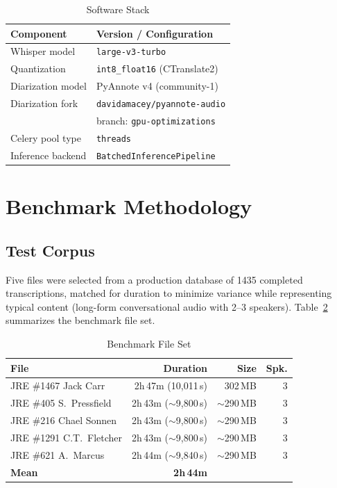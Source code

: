 \documentclass[conference,10pt]{IEEEtran}
\begin{document}
\begin{table}[!t]
\centering
\caption{Software Stack}
\label{tab:software}
\begin{tabular}{@{}ll@{}}
\toprule
\textbf{Component} & \textbf{Version / Configuration} \\
\midrule
Whisper model      & \texttt{large-v3-turbo} \\
Quantization       & \texttt{int8\_float16} (CTranslate2) \\
Diarization model  & PyAnnote v4 (community-1) \\
Diarization fork   & \texttt{davidamacey/pyannote-audio} \\
                   & \quad branch: \texttt{gpu-optimizations} \\
Celery pool type   & \texttt{threads} \\
Inference backend  & \texttt{BatchedInferencePipeline} \\
\bottomrule
\end{tabular}
\end{table}

\section{Benchmark Methodology}

\subsection{Test Corpus}

Five files were selected from a production database of \num{1435} completed
transcriptions, matched for duration to minimize variance while representing
typical content (long-form conversational audio with 2--3 speakers).
Table~\ref{tab:files} summarizes the benchmark file set.

\begin{table}[!t]
\centering
\caption{Benchmark File Set}
\label{tab:files}
\begin{tabular}{@{}lrrr@{}}
\toprule
\textbf{File} & \textbf{Duration} & \textbf{Size} & \textbf{Spk.} \\
\midrule
JRE \#1467 Jack Carr       & 2h\,47m (10,011\,s) & 302\,MB & 3 \\
JRE \#405 S.\ Pressfield   & 2h\,43m (${\sim}$9,800\,s) & ${\sim}$290\,MB & 3 \\
JRE \#216 Chael Sonnen      & 2h\,43m (${\sim}$9,800\,s) & ${\sim}$290\,MB & 3 \\
JRE \#1291 C.T.\ Fletcher   & 2h\,43m (${\sim}$9,800\,s) & ${\sim}$290\,MB & 3 \\
JRE \#621 A.\ Marcus        & 2h\,44m (${\sim}$9,840\,s) & ${\sim}$290\,MB & 3 \\
\midrule
\textbf{Mean}              & \textbf{2h\,44m} & & \\
\bottomrule
\end{tabular}
\end{table}
\end{document}
